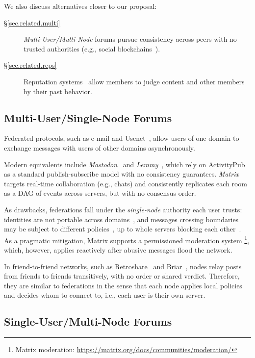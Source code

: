 \documentclass[10pt,twocolumn]{article}
\begin{document}
We also discuss alternatives closer to our proposal:
%
\begin{description}
\item [\S\ref{sec.related.multi}]
\emph{Multi-User/Multi-Node} forums pursue consistency across peers with no
trusted authorities (e.g., social blockchains~\cite{blockchain.osn}).
\item [\S\ref{sec.related.reps}]
    Reputation systems~\cite{rep.systems} allow members to judge content and
    other members by their past behavior.
\end{description}

\subsection{Multi-User/Single-Node Forums}
\label{sec.related.users}

Federated protocols, such as e-mail and Usenet~\cite{fed.usenet}, allow users
of one domain to exchange messages with users of other domains asynchronously.

Modern equivalents include \emph{Mastodon}~\cite{p2p.mastodon,p2p.flocking} and
\emph{Lemmy}~\cite{forum.lemmy}, which rely on
ActivityPub~\cite{pubsub.activitypub} as a standard publish-subscribe model
with no consistency guarantees.
%
\emph{Matrix}~\cite{fed.matrix} targets real-time collaboration (e.g., chats)
and consistently replicates each room as a DAG of events across servers, but
with no consensus order.

As drawbacks, federations fall under the \emph{single-node} authority each user
trusts:
    identities are not portable across domains~\cite{fed.distributed}, and
    messages crossing boundaries may be subject to different
    policies~\cite{p2p.ecosystem}, up to whole servers blocking each
    other~\cite{fed.defederation,fed.blocklists}.
%
As a pragmatic mitigation, Matrix supports a permissioned moderation system%
\footnote{Matrix moderation:
    \url{https://matrix.org/docs/communities/moderation/}},
which, however, applies reactively after abusive messages flood the network.

In friend-to-friend networks, such as Retroshare~\cite{p2p.retroshare} and
Briar~\cite{p2p.briar}, nodes relay posts from friends to friends
transitively, with no order or shared verdict.
%
Therefore, they are similar to federations in the sense that each node applies
local policies and decides whom to connect to, i.e., each user is their own
server.

\subsection{Single-User/Multi-Node Forums}
\label{sec.related.nodes}
\end{document}
